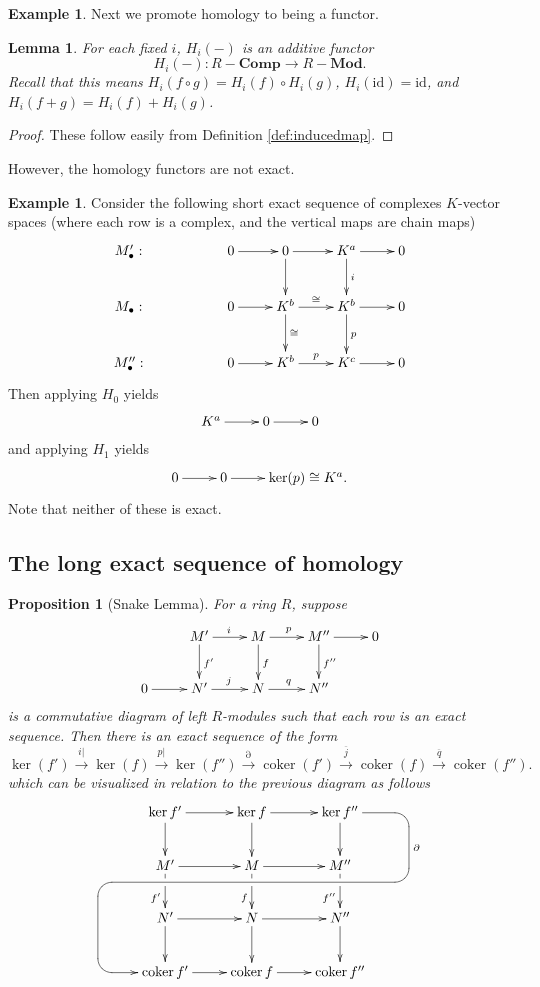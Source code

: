 \documentclass{amsart}[12pt]
\def\ker{\operatorname{ker}}
\def\coker{\operatorname{coker}}
\newcommand{\id}{\mathrm{id}}
\numberwithin{equation}{section}
\theoremstyle{plain} %
\newtheorem{lem}[equation]{Lemma}
\newtheorem{prop}[equation]{Proposition}
\theoremstyle{definition}
\newtheorem{ex}[equation]{Example}
\theoremstyle{remark}
\newcommand{\ssec}[1]{\subsection{#1}}
\newcommand{\xra}[1]{\xrightarrow{#1}}
\newcommand{\Mod}[1]{#1-\mathbf{Mod}}
\newcommand{\Cx}[1]{#1-\mathbf{Comp}}
\begin{document}
\begin{ex}
Next we promote homology to being a functor.


\begin{lem} For each fixed $i$, $H_i(-)$ is an additive functor 
\[H_i(-):\Cx{R} \to \Mod{R}.\]
Recall that this means $H_i(f\circ g) = H_i(f) \circ H_i(g)$, $H_i(\id) =
  \id$, and $H_i(f+g) = H_i(f) + H_i(g)$.
    \end{lem}
 \begin{proof}
These follow easily from Definition \ref{def:inducedmap}.
 \end{proof}   
 
 However, the homology functors are not exact.
 
 \begin{ex}
 Consider the following short exact sequence of complexes $K$-vector spaces (where each row is a complex, and the vertical maps are chain maps)
 \[ \xymatrix{M'_\bullet: && 0 \ar[r] & 0 \ar[r]\ar[d] & K^a \ar[r] \ar[d]^-i& 0 \\
M_\bullet: && 0\ar[r] &  K^b \ar[r]^-\cong \ar[d]^-\cong & K^b\ar[r]\ar[d]^p & 0 \\
M''_\bullet: && 0 \ar[r]  & K^b \ar[r]^-p & K^c \ar[r] & 0}\]
Then applying $H_0$ yields
\[ \xymatrix{ K^a \ar[r] & 0 \ar[r] & 0}\]
and applying $H_1$ yields
\[ \xymatrix{ 0 \ar[r] & 0 \ar[r] & \ker(p)\cong K^a.}\]
Note that neither of these is exact.
\end{ex}
 
 
\ssec{The long exact sequence of homology}       



\begin{prop}[Snake Lemma] For a ring $R$, suppose
$$
\xymatrix{
 & M' \ar[r]^i \ar[d]^{f'} & M \ar[r]^p \ar[d]^{f}  & M'' \ar[r] \ar[d]^{f''}  & 0 \\
0 \ar[r] & N' \ar[r]^j            & N \ar[r]^q            & N''          &  \\
}
$$
is a commutative diagram of left $R$-modules such that each row is an exact sequence. 
Then there is an exact sequence of the form
$$
\ker(f') \xra{i|} \ker(f) \xra{p|} \ker(f'') \xra{\partial} \coker(f') \xra{\overline{j}}  \coker(f) \xra{\overline{q}} \coker(f'') .
$$
which can be visualized in relation to the previous diagram as follows
$$\xymatrix{
  & \ker f' \ar[r]\ar[d] & \ker f \ar[r] \ar[d] & \ker f'' \ar[d]\\
  & M' \ar[r] \ar[d]_(.6){f'}|(.3)\hole
      & M \ar[r] \ar[d]_(.6){f}|(.3)\hole
      & M'' \ar[d]_(.6){f''}|(.3)\hole="hole" &  \\
   & N' \ar[r] \ar[d] & N \ar[r]\ar[d] & N'' \ar[d] \\
  & \coker f' \ar[r]
      \ar@{<-} `l [lu]-(.5,0) `"hole" `[rrruu]+(.5,0) `[rruuu]_-\partial [rruuu]
      & \coker f \ar[r] & \coker f''}$$



\end{prop}
\end{ex}
\end{document}
